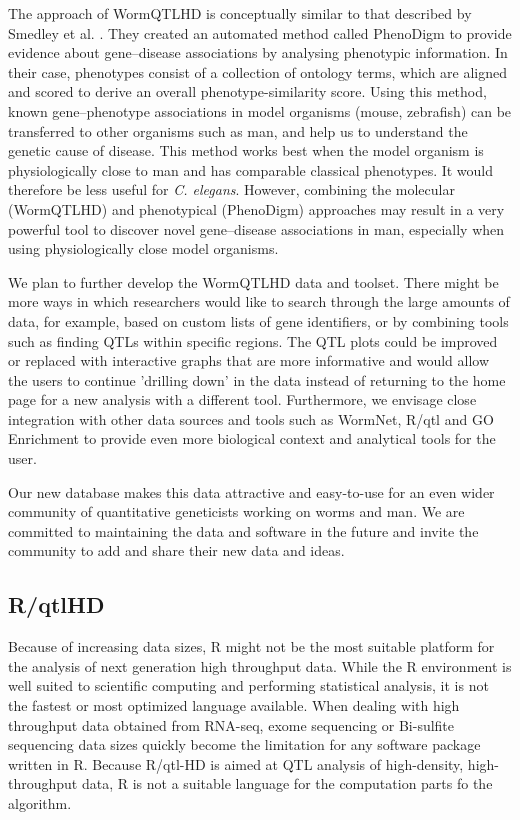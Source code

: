 The approach of WormQTLHD is conceptually similar to that described by Smedley et al. 
\cite{Smedley:2013}. They created an automated method called PhenoDigm to provide evidence about 
gene–disease associations by analysing phenotypic information. In their case, phenotypes consist of 
a collection of ontology terms, which are aligned and scored to derive an overall phenotype-similarity score. Using this 
method, known gene–phenotype associations in model organisms (mouse, zebrafish) can be transferred 
to other organisms such as man, and help us to understand the genetic cause of disease. This method 
works best when the model organism is physiologically close to man and has comparable classical 
phenotypes. It would therefore be less useful for \emph{C. elegans}. However, combining the molecular 
(WormQTLHD) and phenotypical (PhenoDigm) approaches may result in a very powerful tool to discover 
novel gene–disease associations in man, especially when using physiologically close model organisms.

We plan to further develop the WormQTLHD data and toolset. There might be more ways in which 
researchers would like to search through the large amounts of data, for example, based on custom 
lists of gene identifiers, or by combining tools such as finding QTLs within specific regions. 
The QTL plots could be improved or replaced with interactive graphs that are more informative and 
would allow the users to continue 'drilling down' in the data instead of returning to the home page 
for a new analysis with a different tool. Furthermore, we envisage close integration with other data 
sources and tools such as WormNet, R/qtl and GO Enrichment to provide even more biological context 
and analytical tools for the user.

Our new database makes this data attractive and easy-to-use for an even wider community of 
quantitative geneticists working on worms and man. We are committed to maintaining the data and 
software in the future and invite the community to add and share their new data and ideas. 

\subsection*{R/qtlHD}
Because of increasing data sizes, R might not be the most suitable platform for the analysis 
of next generation high throughput data. While the R environment is well suited to scientific 
computing and performing statistical analysis, it is not the fastest or most optimized 
language available. When dealing with high throughput data obtained from RNA-seq, exome sequencing 
or Bi-sulfite sequencing data sizes quickly become the limitation for any software package 
written in R. Because R/qtl-HD is aimed at QTL analysis of high-density, high-throughput data, 
R is not a suitable language for the computation parts fo the algorithm.

